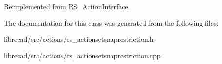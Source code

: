 Reimplemented from \hyperlink{classRS__ActionInterface_aa2ba8f6f697f735eace4ec5449c0b8cd}{R\-S\-\_\-\-Action\-Interface}.



The documentation for this class was generated from the following files\-:\begin{DoxyCompactItemize}
\item 
librecad/src/actions/rs\-\_\-actionsetsnaprestriction.\-h\item 
librecad/src/actions/rs\-\_\-actionsetsnaprestriction.\-cpp\end{DoxyCompactItemize}
